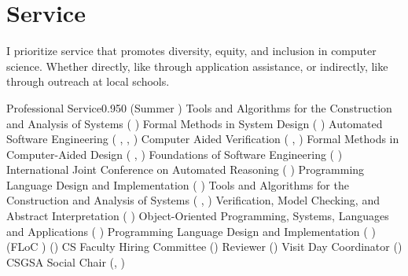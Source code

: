 \documentclass{federico_cv}
\begin{document}
\section{Service}

I prioritize service that promotes diversity, equity, and inclusion in computer
science. Whether directly, like through application assistance, or
indirectly, like through outreach at local schools.

\begin{tblSubSection}{Professional Service}{0.95}{0}
{ (Summer )}
{Tools and Algorithms for the Construction and Analysis of Systems ( )}
{Formal Methods in System Design ( )}
{Automated Software Engineering ( , , )}
{Computer Aided Verification ( , )}
{Formal Methods in Computer-Aided Design ( , )}
{Foundations of Software Engineering ( )}
{International Joint Conference on Automated Reasoning ( )}
{Programming Language Design and Implementation ( )}
{Tools and Algorithms for the Construction and Analysis of Systems ( , )}
{Verification, Model Checking, and Abstract Interpretation ( )}
{Object-Oriented Programming, Systems, Languages and Applications ( )}
{Programming Language Design and Implementation ( )}
{ (FLoC )}
{ ()}
{CS Faculty Hiring Committee ()}
{ Reviewer ()}
{Visit Day Coordinator ()}
{CSGSA Social Chair (, )}
\end{tblSubSection}
\end{document}
